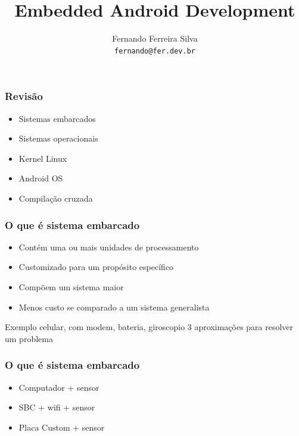 \documentclass{beamer}
\title{Embedded Android Development}
\author{Fernando Ferreira Silva \\ \texttt{fernando@fer.dev.br}}
\begin{document}
\begin{frame}
  \titlepage
\end{frame}

\begin{frame}
  \frametitle{Revisão}
  \begin{itemize}
  \item Sistemas embarcados
  \item Sistemas operacionais
  \item Kernel Linux
  \item Android OS
  \item Compilação cruzada
  \end{itemize}  
\end{frame}

\begin{frame}
  \frametitle{O que é sistema embarcado}
  \begin{itemize}
  \item Contém uma ou mais unidades de processamento
  \item Customizado para um propósito específico
  \item Compõem um sistema maior
  \item Menos custo se comparado a um sistema generalista
  \end{itemize}
  Exemplo celular, com modem, bateria, giroscopio
  3 aproximações para resolver um problema

\end{frame}

\begin{frame}
  \frametitle{O que é sistema embarcado}
  \begin{itemize}
  \item Computador +  sensor
  \item SBC +  wifi +  sensor
  \item Placa Custom + sensor
  \end{itemize}
\end{frame}
\end{document}
